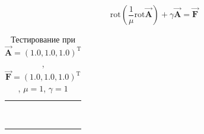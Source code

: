 \begin{equation} \label{eq_2_1}
	\text{rot} \left(\frac{1}{\mu} \text{rot} \overrightarrow{\textbf{A}}\right) + \gamma \overrightarrow{\textbf{A}} = \overrightarrow{\textbf{F}}
\end{equation}

\begin{table}
	\caption{Тестирование при $\overrightarrow{\textbf{A}} = (1.0, 1.0, 1.0)^{\text{T}}$, $\overrightarrow{\textbf{F}} = (1.0, 1.0, 1.0)^{\text{T}}$, $\mu = 1$, $\gamma = 1$}
	\centering
	\small
	\begin{tabularx}{1.0\textwidth}{| >{\raggedright\arraybackslash}X | >{\raggedright\arraybackslash}X | >{\raggedright\arraybackslash}X |>{\raggedright\arraybackslash}X |}
		\hline
		\centering{Ребро} & \centering{Значение} & \centering{Абсолютная погрешность} & \centering{Относительная погрешность} \tabularnewline \hline
		

		 \centering{($x; 1.0; 1.0$)} & \centering{1.00000000E+000}& \centering{0.00000000E+000} & \centering{0.00000000E+000} \tabularnewline \hline
	
		 \centering{($x; 2.0; 1.0$)} & \centering{1.00000000E+000}& \centering{0.00000000E+000} & \centering{0.00000000E+000} \tabularnewline \hline

		 \centering{($x; 1.0; 2.0$)} & \centering{1.00000000E+000}& \centering{0.00000000E+000} & \centering{0.00000000E+000} \tabularnewline \hline

		 \centering{($x; 2.0; 2.0$)} & \centering{1.00000000E+000}& \centering{0.00000000E+000} & \centering{0.00000000E+000} \tabularnewline \hline



		 \centering{($1.0; y; 1.0$)} & \centering{1.00000000E+000}& \centering{0.00000000E+000} & \centering{0.00000000E+000} \tabularnewline \hline

		\centering{($2.0; y; 1.0$)} & \centering{1.00000000E+000}& \centering{0.00000000E+000} & \centering{0.00000000E+000} \tabularnewline \hline

		\centering{($1.0; y; 2.0$)} & \centering{1.00000000E+000}& \centering{0.00000000E+000} & \centering{0.00000000E+000} \tabularnewline \hline

		\centering{($2.0; y; 2.0$)} & \centering{1.00000000E+000}& \centering{0.00000000E+000} & \centering{0.00000000E+000} \tabularnewline \hline



		 \centering{($1.0; 1.0; z$)} & \centering{1.00000000E+000}& \centering{0.00000000E+000} & \centering{0.00000000E+000} \tabularnewline \hline


\end{tabularx}
\end{table}
